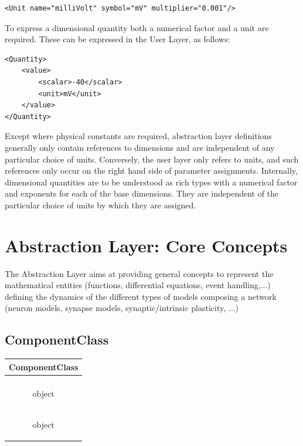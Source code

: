 \documentclass{article}
\begin{document}
\begin{lstlisting}[frame=none]
<Unit name="milliVolt" symbol="mV" multiplier="0.001"/>
\end{lstlisting}


To express a dimensional quantity both a numerical factor and a unit are required. These can be  expressed in the User Layer, as follows: 

\begin{lstlisting}[frame=none]
<Quantity>
	<value>
		<scalar>-40</scalar>
		<unit>mV</unit>
	</value>
</Quantity> 
\end{lstlisting}

Except where physical constants are required, abstraction layer definitions generally only contain references to dimensions and are independent of any particular choice of units. Conversely, the user layer only refers to units, and such references only occur on the right hand side of parameter assignments. Internally, dimensional quantities are to be understood as rich types with a numerical factor and exponents for each of the base dimensions. They are independent of the particular choice of units by which they are assigned.

\section{Abstraction Layer: Core Concepts }
\label{AbstractionL}

The Abstraction Layer aims at providing general concepts to represent the
mathematical entities (functions, differential equations, event handling,...) defining the dynamics of the different types of models composing a network (neuron models, synapse models, synaptic/intrinsic
plasticity, ...)

\subsection{ComponentClass}


\begin{table}[htb]
\center
\begin{tabular}{|c|}
\hline
\hline
ComponentClass \\
\hline \\
\colorbox{issuecolor}{\parbox{0.4\linewidth}
{ object}} \\
\hline
\colorbox{issuecolor}{\parbox{0.4\linewidth}
{ object}} \\
\hline
\end{tabular}
\end{table}
\end{document}
